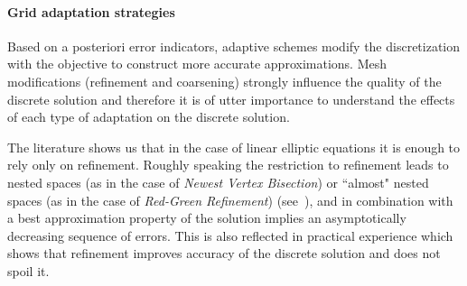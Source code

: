 \documentclass[enabledeprecatedfontcommands,cleardoublepage=empty,headsepline,twoside,11pt,DIV=15,BCOR=12mm,final]{scrartcl}
\begin{document}



\paragraph{Grid adaptation strategies}
Based on a posteriori error indicators, adaptive schemes modify the discretization with the objective to construct more accurate approximations. Mesh modifications (refinement and coarsening) strongly influence the quality of the discrete solution and therefore it is of utter importance to understand the effects of each type of adaptation on the discrete solution.

The literature shows us that in the case of linear elliptic equations it is enough to rely only on refinement. Roughly speaking the restriction to refinement leads to nested spaces (as in the case of \emph{Newest Vertex Bisection}) or ``almost" nested spaces (as in the case of \emph{Red-Green Refinement}) (see~\cite{Verfurth:96}), and in combination with a best approximation property of the solution implies an asymptotically decreasing sequence of errors. This is also reflected in practical experience which shows that refinement improves accuracy of the discrete solution and does not spoil it.
\end{document}
